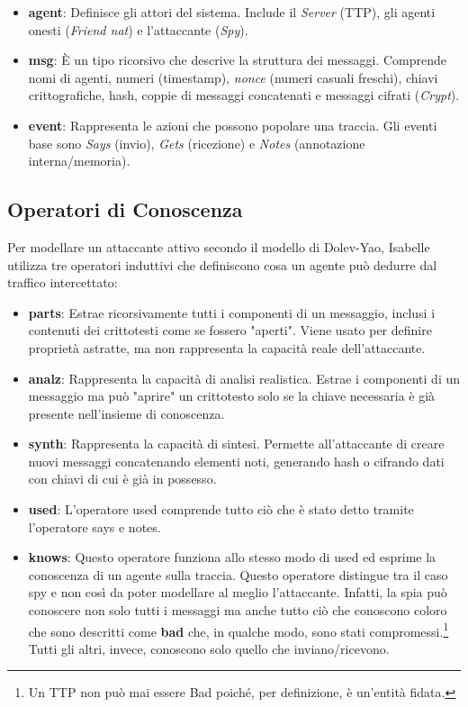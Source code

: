 \begin{itemize}
    \item \textbf{agent}: Definisce gli attori del sistema. Include il \textit{Server} (TTP), gli agenti onesti (\textit{Friend nat}) e l'attaccante (\textit{Spy}).
    \item \textbf{msg}: È un tipo ricorsivo che descrive la struttura dei messaggi. Comprende nomi di agenti, numeri (timestamp), \textit{nonce} (numeri casuali freschi), chiavi crittografiche, hash, coppie di messaggi concatenati e messaggi cifrati (\textit{Crypt}).
    \item \textbf{event}: Rappresenta le azioni che possono popolare una traccia. Gli eventi base sono \textit{Says} (invio), \textit{Gets} (ricezione) e \textit{Notes} (annotazione interna/memoria).
\end{itemize}

\subsection{Operatori di Conoscenza}
Per modellare un attaccante attivo secondo il modello di Dolev-Yao, Isabelle utilizza tre operatori induttivi che definiscono cosa un agente può dedurre dal traffico intercettato:

\begin{itemize}
    \item \textbf{parts}: Estrae ricorsivamente tutti i componenti di un messaggio, inclusi i contenuti dei crittotesti come se fossero "aperti". Viene usato per definire proprietà astratte, ma non rappresenta la capacità reale dell'attaccante.
    \item \textbf{analz}: Rappresenta la capacità di analisi realistica. Estrae i componenti di un messaggio ma può "aprire" un crittotesto solo se la chiave necessaria è già presente nell'insieme di conoscenza.
    \item \textbf{synth}: Rappresenta la capacità di sintesi. Permette all'attaccante di creare nuovi messaggi concatenando elementi noti, generando hash o cifrando dati con chiavi di cui è già in possesso.
    \item \textbf{used}: L'operatore used comprende tutto ciò che è stato detto tramite l'operatore says e notes. 
    \item \textbf{knows}: Questo operatore funziona allo stesso modo di used ed esprime la conoscenza di un agente sulla traccia. Questo operatore distingue tra il caso spy e non così da poter modellare al meglio l'attaccante. Infatti, la spia può conoscere non solo tutti i messaggi ma anche tutto ciò che conoscono coloro che sono descritti come \textbf{bad} che, in qualche modo, sono stati compromessi.\footnote{Un TTP non può mai essere Bad poiché, per definizione, è un'entità fidata.} Tutti gli altri, invece, conoscono solo quello che inviano/ricevono.
\end{itemize}

